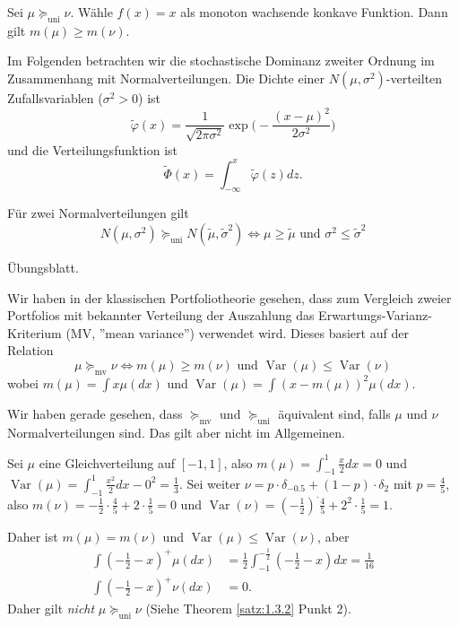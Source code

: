 \documentclass[a4paper,twoside,DIV15,BCOR12mm]{scrbook}
\newcommand{\unisucceq}{\succeq_{\text{uni}}}
\newcommand{\mvsucceq}{\succeq_{\text{mv}}}
\DeclareMathOperator{\Var}{Var}
\begin{document}
\begin{bemerkung}
Sei $\mu \unisucceq \nu$. Wähle $f(x) = x$ als monoton wachsende konkave Funktion. Dann gilt \mbox{$m(\mu) \ge m(\nu)$}.
\end{bemerkung}

Im Folgenden betrachten wir die stochastische Dominanz zweiter Ordnung im Zusammenhang mit Normalverteilungen. Die Dichte einer $N(\mu,\sigma^2)$-verteilten Zufallsvariablen ($\sigma^2>0$) ist
\[
\tilde\varphi(x) = \frac1{\sqrt{2\pi\sigma^2}} \exp\Big(-\frac{(x-\mu)^2}{2\sigma^2}\Big)
\]
und die Verteilungsfunktion ist
\[
\tilde\Phi(x) = \int_{-\infty}^x \tilde\varphi(z) dz.
\]

\begin{satz}
Für zwei Normalverteilungen gilt
\[
N(\mu,\sigma^2) \unisucceq N(\tilde\mu,\tilde\sigma^2) \iff \mu\ge \tilde\mu \text{ und } \sigma^2 \le \tilde\sigma^2
\]
\end{satz}

\begin{beweis}
Übungsblatt.
\end{beweis}

Wir haben in der klassischen Portfoliotheorie gesehen, dass zum Vergleich zweier Portfolios mit bekannter Verteilung der Auszahlung das Erwartungs-Varianz-Kriterium (MV, ”mean variance”) verwendet wird. Dieses basiert auf der Relation
\[
\mu \mvsucceq \nu \iff m(\mu) \ge m(\nu) \text{ und } \Var(\mu) \le \Var(\nu)
\]
wobei $m(\mu) = \int x \mu(dx)$ und $\Var(\mu) = \int (x-m(\mu))^2 \mu(dx)$.

Wir haben gerade gesehen, dass $\mvsucceq$ und $\unisucceq$ äquivalent sind, falls $\mu$ und $\nu$ Normalverteilungen sind. Das gilt aber nicht im Allgemeinen.

\begin{beispiel}
Sei $\mu$ eine Gleichverteilung auf $[-1,1]$, also $m(\mu) = \int_{-1}^1 \frac x2 dx = 0$ und \mbox{$\Var(\mu) = \int_{-1}^{1} \frac{x^2}2 dx - 0^2 = \frac 13$}.
Sei weiter $\nu = p \cdot \delta_{-0.5} + (1-p)\cdot \delta_{2}$ mit $p=\frac45$, also $m(\nu) = -\frac 12 \cdot \frac 45 + 2 \cdot \frac 1 5 = 0$ und $\Var(\nu) = (-\frac 12)^ \cdot \frac 45 + 2^2\cdot \frac 15 = 1$.

Daher ist $m(\mu)=m(\nu)$ und $\Var(\mu) \le \Var(\nu)$, aber 
\begin{align*}
\int (-\frac 12 - x)^+\mu(dx) &= \frac 12 \int_{-1}^{-\frac12} (-\frac 12 - x)dx = \frac 1{16} \\
\int (-\frac 12 - x)^+\nu(dx) &= 0.
\end{align*}
Daher gilt \emph{nicht} $\mu\unisucceq\nu$ (Siehe Theorem \ref{satz:1.3.2} Punkt 2).
\end{beispiel}
\end{document}
